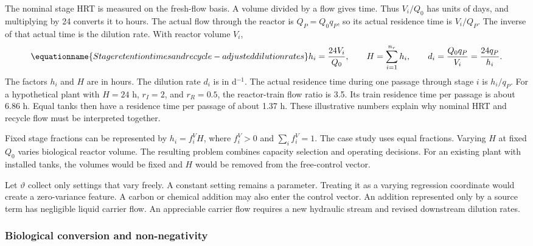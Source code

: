 The nominal stage HRT is measured on the fresh-flow basis. A volume divided by a flow gives time. Thus $V_i/Q_0$ has units of days, and multiplying by 24 converts it to hours. The actual flow through the reactor is $Q_P=Q_0q_P$, so its actual residence time is $V_i/Q_P$. The inverse of that actual time is the dilution rate. With reactor volume $V_i$,
\begin{equation}
\equationname{Stage retention times and recycle-adjusted dilution rates}
h_i=\frac{24V_i}{Q_0},\qquad H=\sum_{i=1}^{n_r}h_i,\qquad
d_i=\frac{Q_0q_P}{V_i}=\frac{24q_P}{h_i}.
\label{eq:plant_residence}
\end{equation}
The factors $h_i$ and $H$ are in hours. The dilution rate $d_i$ is in d$^{-1}$. The actual residence time during one passage through stage $i$ is $h_i/q_P$. For a hypothetical plant with $H=24$ h, $r_I=2$, and $r_R=0.5$, the reactor-train flow ratio is 3.5. Its train residence time per passage is about 6.86 h. Equal tanks then have a residence time per passage of about 1.37 h. These illustrative numbers explain why nominal HRT and recycle flow must be interpreted together.

Fixed stage fractions can be represented by $h_i=f_i^V H$, where $f_i^V>0$ and $\sum_i f_i^V=1$. The case study uses equal fractions. Varying $H$ at fixed $Q_0$ varies biological reactor volume. The resulting problem combines capacity selection and operating decisions. For an existing plant with installed tanks, the volumes would be fixed and $H$ would be removed from the free-control vector.

Let $\vartheta$ collect only settings that vary freely. A constant setting remains a parameter. Treating it as a varying regression coordinate would create a zero-variance feature. A carbon or chemical addition may also enter the control vector. An addition represented only by a source term has negligible liquid carrier flow. An appreciable carrier flow requires a new hydraulic stream and revised downstream dilution rates.

\subsubsection{Biological conversion and non-negativity}

